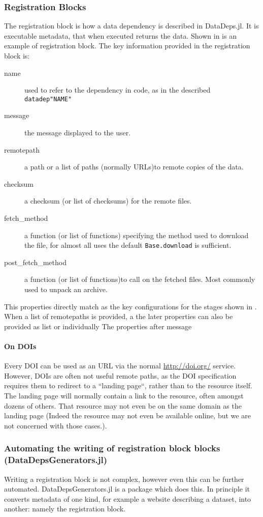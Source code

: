 \documentclass{jors}
\newcommand{\datadep}[1]{\texttt{datadep"{}#1"{}}}
\begin{document}
\subsubsection{Registration Blocks}
The registration block is how a data dependency is described in DataDeps.jl.
It is executable metadata, that when executed returns the data.
Shown in  is an example of registration block.
The key information provided in the registration block is:
\begin{description}
\item[name] used to refer to the dependency in code, as in the described \datadep{NAME}
\item[message] the message displayed to the user.
\item[remotepath] a path or a list of paths (normally URLs)to remote copies of the data.
\item[checksum] a checksum (or list of checksums) for the remote files.
\item[fetch_method]  a function  (or list of functions) specifying the method used to download the file, for almost all uses the default \texttt{Base.download} is sufficient.
\item[post_fetch_method] a function  (or list of functions)to call on the fetched files. Most commonly used to unpack an archive.
\end{description}
This properties directly match as the key configurations for the stages shown in .
When a list of remotepaths is provided,
a the later properties can also be provided as list or individually
The properties after message 


\paragraph{On DOIs}
Every DOI can be used as an URL via the normal \url{http://doi.org/} service.
However, DOIs are often not useful remote paths,
as the DOI specification requires them to redirect to a ``landing page``, rather than to the resource itself.
The landing page will normally contain a link to the resource, often amongst dozens of others.
That resource may not even be on the same domain as the landing page (Indeed the resource may not even be available online, but we are not concerned with those cases.).



\subsubsection{Automating the writing of registration block blocks (DataDepsGenerators.jl)}
Writing a registration block is not complex, however even this can be further automated.
DataDepsGenerators.jl is a package which does this.
In principle it converts metadata of one kind, for example a website describing a dataset,
into another: namely the registration block.
\end{document}
